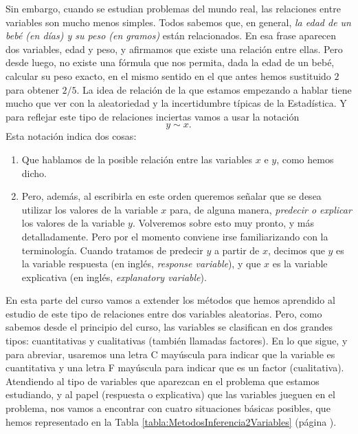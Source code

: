 Sin embargo, cuando se estudian problemas del mundo real, las relaciones entre variables son mucho menos simples. Todos sabemos que, en general, {\em la edad de un bebé (en días) y su peso (en gramos)} están relacionados. En esa frase aparecen dos variables, edad y peso, y afirmamos que existe una relación entre ellas. Pero desde luego, no existe una fórmula que nos permita, dada la edad de un bebé, calcular su peso exacto, en el mismo sentido en el que antes hemos sustituido $2$ para obtener $2/5$. La idea de relación de la que estamos empezando a hablar tiene mucho que ver con la aleatoriedad y la incertidumbre típicas de la Estadística. Y para reflejar este tipo de {\sf relaciones inciertas} vamos a usar la notación
\[y \sim x.\]
Esta notación indica dos cosas:
\begin{enumerate}
  \item Que hablamos de la posible relación entre las variables $x$ e $y$, como hemos dicho.
  \item Pero, además, al escribirla en este orden queremos señalar que se desea utilizar los valores de la variable $x$ para, de alguna manera, {\em predecir o explicar} los valores de la variable $y$. Volveremos sobre esto muy pronto, y más detalladamente. Pero por el momento conviene irse familiarizando con la terminología. Cuando tratamos de predecir $y$ a partir de $x$, decimos que $y$ es la {\sf variable respuesta} (en inglés, {\em response variable}), y que $x$ es la {\sf variable explicativa} (en inglés, {\em explanatory variable}).
\end{enumerate}

En esta parte del curso vamos a extender los métodos que hemos aprendido al estudio de este tipo de relaciones entre dos variables aleatorias. Pero, como sabemos desde el principio del curso, las variables se clasifican en dos grandes tipos: cuantitativas y cualitativas (también llamadas factores). En lo que sigue, y para abreviar, usaremos una letra C mayúscula para indicar que la variable es cuantitativa y una letra F mayúscula para indicar que es un factor (cualitativa). Atendiendo al tipo de variables que aparezcan en el problema que estamos estudiando, y al papel (respuesta o explicativa) que las variables jueguen en el problema, nos vamos a encontrar con cuatro situaciones básicas posibles, que hemos representado en la Tabla \ref{tabla:MetodosInferencia2Variables} (página \pageref{tabla:MetodosInferencia2Variables}).

